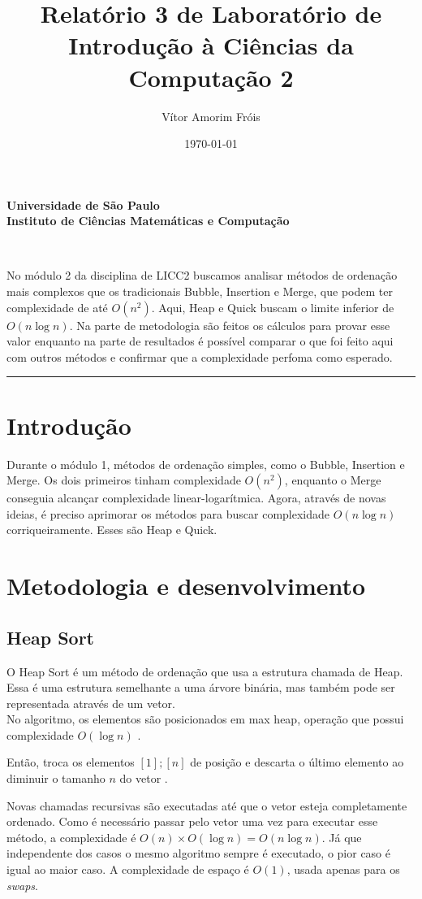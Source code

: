 \documentclass[fontsize=11pt]{article}
\title{
\Large{Relatório 3 de Laboratório de Introdução à Ciências da Computação 2}\\
[10pt] 
}
\author{Vítor Amorim Fróis}
\date{\today}
\makeatletter
\renewenvironment{abstract} %
  {\small
  \begin{center}
  \bfseries \abstractname\vspace{-.5em}\vspace{0pt}
  \end{center}
  \list{}{%
    \setlength{\leftmargin}{0mm}
    \setlength{\rightmargin}{\leftmargin}%
  }
  \item\relax}
 {\endlist}
\renewcommand{\maketitle}{\bgroup\setlength{\parindent}{0pt}%
\begin{center}
    \textbf{
      Universidade de São Paulo\\
      Instituto de Ciências Matemáticas e Computação
    }
\end{center}
\begin{flushleft}
  \textbf{\@title}
  \@author\\
  [3pt] 
  \@date
\end{flushleft}\egroup
}
\makeatother
\begin{document}
\maketitle

\begin{abstract}
  No módulo 2 da disciplina de LICC2 buscamos analisar métodos de ordenação mais complexos que os tradicionais Bubble, Insertion e Merge, que podem ter complexidade de até $O(n^2)$. Aqui, Heap e Quick buscam o limite inferior de $O(n\log n)$. Na parte de metodologia são feitos os cálculos para provar esse valor enquanto na parte de resultados é possível comparar o que foi feito aqui com outros métodos e confirmar que a complexidade perfoma como esperado.
\end{abstract}

\rule{\linewidth}{0.2pt}

\section{Introdução}
    Durante o módulo 1, métodos de ordenação simples, como o Bubble, Insertion
    e Merge. Os dois primeiros tinham complexidade $O(n^2)$, enquanto o Merge 
    conseguia alcançar complexidade linear-logarítmica.
    Agora, através de novas ideias, é preciso aprimorar os métodos para buscar
    complexidade $O(n\log n)$ corriqueiramente. Esses são Heap e Quick. 

\section{Metodologia e desenvolvimento}
  \subsection{Heap Sort}
    O Heap Sort é um método de ordenação que usa a estrutura chamada de Heap.
    Essa é uma estrutura semelhante a uma árvore binária, mas também pode ser 
    representada através de um vetor. 
    \\ No algoritmo, os elementos são posicionados em max heap, operação que possui 
    complexidade $O(\log n)$ \cite{heapSort}. 
    
    Então, troca os elementos $[1];[n]$ de posição e descarta
    o último elemento ao diminuir o tamanho $n$ do vetor \cite{mitvideo}. 
    
    Novas chamadas 
    recursivas são executadas até que o vetor esteja completamente ordenado.
    Como é necessário passar pelo vetor uma vez para executar esse método,
    a complexidade é $O(n) \times O(\log n) = O(n\log n)$.
    Já que independente dos casos o mesmo algoritmo sempre é executado, 
    o pior caso é igual ao maior caso.
    A complexidade de espaço é $O(1)$, usada apenas para os \textit{swaps}.
\end{document}
